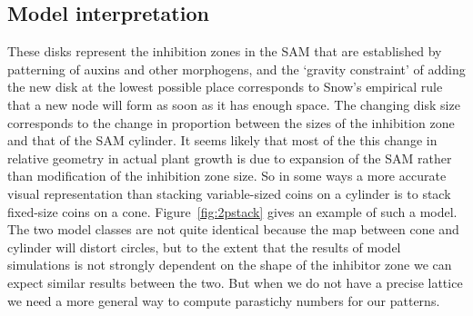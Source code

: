 \subsection{Model interpretation}
These disks represent the inhibition zones in the SAM that are established by patterning of auxins and other morphogens, and the `gravity constraint' of adding the new disk at the lowest possible place corresponds to Snow's empirical rule that a new node will form as soon as it has enough space. The changing disk size corresponds to the change in proportion between the sizes of the inhibition zone and that of the SAM cylinder. It seems likely that most of the this change in relative geometry in actual plant growth is due to expansion of the SAM rather than modification of the inhibition zone size. So in some ways a more accurate visual representation than stacking variable-sized coins on a cylinder is to stack fixed-size coins on a cone. Figure~\ref{fig:2pstack} gives an example of such a model. The two model classes are not quite identical because the map between cone and cylinder will distort circles, but to the extent that the results of model simulations is not strongly dependent on the shape of the inhibitor zone we can expect similar results between the two.
But when we do not have a precise lattice we need a more general way to compute parastichy numbers for our patterns.


\clearpage
